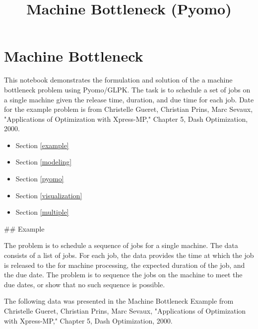 \documentclass[11pt]{article}
\title{Machine Bottleneck (Pyomo)}
\providecommand{\tightlist}{%
      \setlength{\itemsep}{0pt}\setlength{\parskip}{0pt}}
\begin{document}
    
    
    \maketitle
    
    

    
    \section{Machine Bottleneck}\label{machine-bottleneck}

This notebook demonstrates the formulation and solution of the a machine
bottleneck problem using Pyomo/GLPK. The task is to schedule a set of
jobs on a single machine given the release time, duration, and due time
for each job. Date for the example problem is from Christelle Gueret,
Christian Prins, Marc Sevaux, "Applications of Optimization with
Xpress-MP," Chapter 5, Dash Optimization, 2000.

\begin{itemize}
\tightlist
\item
  Section \ref{example}
\item
  Section \ref{modeling}
\item
  Section \ref{pyomo}
\item
  Section \ref{visualization}
\item
  Section \ref{multiple}
\end{itemize}

     \#\# Example

The problem is to schedule a sequence of jobs for a single machine. The
data consists of a list of jobs. For each job, the data provides the
time at which the job is released to the for machine processing, the
expected duration of the job, and the due date. The problem is to
sequence the jobs on the machine to meet the due dates, or show that no
such sequence is possible.

The following data was presented in the Machine Bottleneck Example from
Christelle Gueret, Christian Prins, Marc Sevaux, "Applications of
Optimization with Xpress-MP," Chapter 5, Dash Optimization, 2000.
\end{document}
